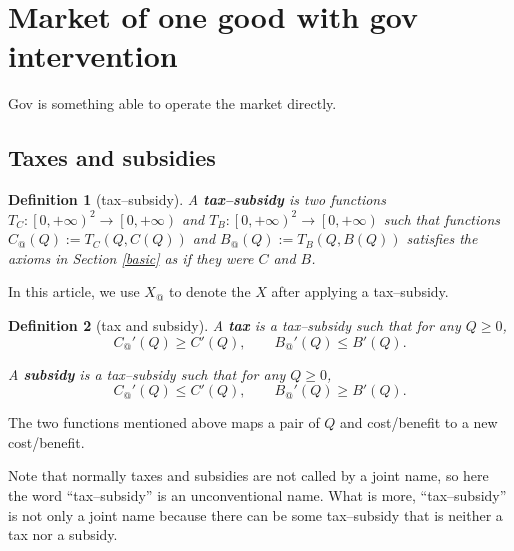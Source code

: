 \documentclass{article}
\newtheorem{definition}{Definition}[subsection]
\begin{document}
\section{Market of one good with gov intervention}

Gov is something able to operate the market directly.

\subsection{Taxes and subsidies}

\begin{definition}[tax--subsidy]
\label{tax--subsidy}
A \textbf{tax--subsidy} is two functions
$T_C:\left[0,+\infty\right)^2\to\left[0,+\infty\right)$ and
$T_B:\left[0,+\infty\right)^2\to\left[0,+\infty\right)$
such that functions $C_@\!\left(Q\right):=T_C\!\left(Q,C\!\left(Q\right)\right)$
and $B_@\!\left(Q\right):=T_B\!\left(Q,B\!\left(Q\right)\right)$
satisfies the axioms in Section \ref{basic} as if they were $C$ and $B$.
\end{definition}

In this article, we use $X_@$ to denote the $X$ after applying a tax--subsidy.

\begin{definition}[tax and subsidy]
\label{tax and subsidy}
A \textbf{tax} is a tax--subsidy such that for any $Q\ge0$,
$$C_@'\!\left(Q\right)\ge C'\!\left(Q\right),
\qquad B_@'\!\left(Q\right)\le B'\!\left(Q\right).$$

A \textbf{subsidy} is a tax--subsidy such that for any $Q\ge0$,
$$C_@'\!\left(Q\right)\le C'\!\left(Q\right),
\qquad B_@'\!\left(Q\right)\ge B'\!\left(Q\right).$$
\end{definition}

The two functions mentioned above maps a pair of $Q$ and cost/benefit to a new cost/benefit.

Note that normally taxes and subsidies are not called by a joint name,
so here the word ``tax--subsidy'' is an unconventional name.
What is more, ``tax--subsidy'' is not only a joint name
because there can be some tax--subsidy that is neither a tax nor a subsidy.
\end{document}
